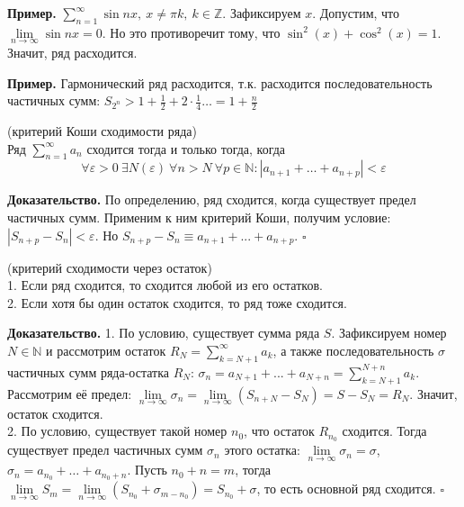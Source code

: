 \textbf{Пример.} $\sum\limits_{n=1}^{\infty} \sin{nx},~x\ne\pi k,~k 
\in\mathbb{Z}$. 
Зафиксируем $x$. Допустим, что $\lim\limits_{n \to \infty}\sin nx=0 $. 
Но это противоречит тому, что $\sin^2(x)+\cos^2(x)=1$. Значит, ряд расходится.

\textbf{Пример.} Гармонический ряд расходится, т.к. расходится 
последовательность частичных сумм: 
$S_{2^n}>1+\frac{1}{2}+2\cdot \frac{1}{4}\ldots=1+\frac{n}{2}$
\begin{theor} (критерий Коши сходимости ряда)\\
Ряд $\sum\limits_{n=1}^{\infty} a_n$ сходится тогда и только тогда, когда
$$\forall\varepsilon>0~\exists N(\varepsilon)~\forall n>N~\forall p\in
\mathbb{N}:|a_{n+1}+\ldots+a_{n+p}|<\varepsilon$$
\end{theor}
\textbf{Доказательство.} По определению, ряд сходится, когда существует предел
частичных сумм. Применим к ним критерий Коши, получим условие: 
$|S_{n+p}-S_n|<\varepsilon$. Но $S_{n+p}-S_n\equiv a_{n+1}+...+a_{n+p}$.
$\square$ 
\begin{theor} (критерий сходимости через остаток)\\
    1. Если ряд сходится, то сходится любой из его остатков.\\
    2. Если хотя бы один остаток сходится, то ряд тоже сходится.
\end{theor}
\textbf{Доказательство.}
1. По условию, существует сумма ряда $S$. Зафиксируем номер $N\in\mathbb{N}$ и 
рассмотрим остаток $R_N=\sum\limits_{k=N+1}^{\infty} a_k$, а также 
последовательность $\sigma$ частичных сумм ряда-остатка $R_N$: 
$\sigma_n=a_{N+1}+...+a_{N+n}=\sum\limits_{k=N+1}^{N+n} a_k$.
Рассмотрим её предел:
$\lim\limits_{n \to \infty} \sigma_n=\lim\limits_{n \to \infty}(S_{n+N}-S_N)
=S-S_N=R_N$. Значит, остаток сходится.\\
2. По условию, существует такой номер $n_0$, что остаток $R_{n_0}$ сходится.
Тогда существует предел частичных сумм $\sigma_n$ этого остатка:
$\lim\limits_{n \to \infty}\sigma_n=\sigma$, 
$\sigma_n=a_{n_0}+\ldots+a_{n_0+n}$. Пусть $n_0+n=m$, тогда
$\lim\limits_{n \to \infty}S_m=\lim\limits_{n \to \infty}
(S_{n_0}+\sigma_{m-n_0})=S_{n_0}+\sigma$, то есть основной ряд сходится.
$\square$ 











